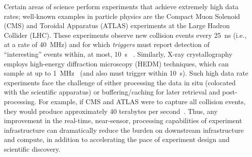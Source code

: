 Certain areas of science perform experiments that achieve extremely high data rates; 
well-known examples in particle physics are the Compact Muon Solenoid (CMS) and Toroidal Apparatus (ATLAS) experiments at the Large Hadron Collider (LHC).
These experiments observe new collision events every 25~ns (i.e., at a rate of 40~MHz) and for which \emph{triggers} must report detection of ``interesting'' events within, at most, 10~\textmu s ~\cite{pmlr-v42-glig14}.
Similarly, X-ray crystallography employs high-energy diffraction microscopy (HEDM) techniques, which can sample at up to 1~MHz~\cite{doi:10.1063/5.0006531} (and also must trigger within 10~\textmu s).
Such high data rate experiments face the challenge of either processing the data in situ (colocated with the scientific apparatus) or buffering/caching for later retrieval and post-processing.
For example, if CMS and ATLAS were to capture all collision events, they would produce approximately 40 terabytes per second~\cite{BORK2021100619}.
Thus, any improvement in the real-time, near-sensor, processing capabilities of experiment infrastructure can dramatically reduce the burden on downstream infrastructure and compute, in addition to accelerating the pace of experiment design and scientific discovery.


